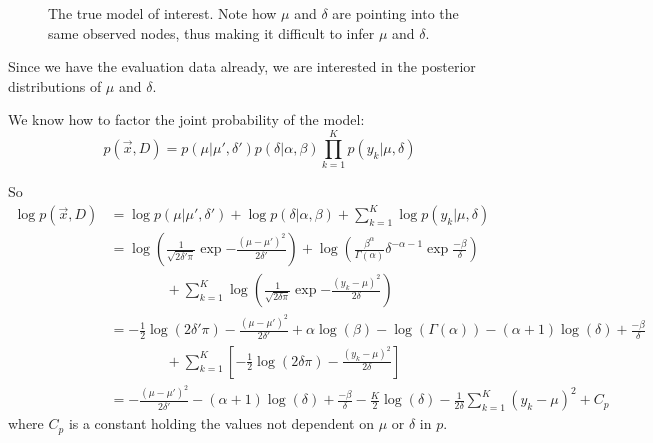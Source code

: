 \documentclass[12pt]{article}
\begin{document}
\begin{figure}[h]
    \centering
{}
    \caption{The true model of interest.  Note how $\mu$ and $\delta$ are
    pointing into the same observed nodes, thus making it difficult to infer
    $\mu$ and $\delta$.}
    \label{fig:pmodel}
\end{figure}

Since we have the evaluation data already, we are interested in the posterior
distributions of $\mu$ and $\delta$.

We know how to factor the joint probability of the model:
\begin{equation}
    p(\vec{x}, D) = p(\mu|\mu', \delta')p(\delta|\alpha, \beta)\prod_{k=1}^{K}p(y_{k}|\mu, \delta)
\end{equation}

So
\begin{align}
    \log{p(\vec{x}, D)} &= \log{p(\mu|\mu', \delta')} + \log{p(\delta|\alpha,
    \beta)} + \sum_{k=1}^{K}
    \log{p(y_{k}|\mu, \delta)} \nonumber \\
    &=
    \log{\left(\frac{1}{\sqrt{2\delta'\pi}}\exp{-\frac{(\mu-\mu')^{2}}{2\delta'}}\right)} +
    \log{\left(\frac{\beta^{\alpha}}{\Gamma(\alpha)}\delta^{-\alpha-1}\exp{\frac{-\beta}{\delta}}\right)}
    \nonumber \\
    &\quad\quad\quad\quad+ \sum_{k=1}^{K}
    \log{\left(\frac{1}{\sqrt{2\delta\pi}}\exp{-\frac{(y_{k}-\mu)^{2}}{2\delta}}\right)}
    \nonumber \\
    &= -\frac{1}{2} \log{(2\delta'\pi)} - \frac{(\mu - \mu')^{2}}{2\delta'} +
    \alpha \log{(\beta)} - \log{(\Gamma(\alpha))} - (\alpha + 1) \log{(\delta)}
    + \frac{-\beta}{\delta}\nonumber \\
    &\quad\quad\quad\quad+ \sum_{k=1}^{K} \left[-\frac{1}{2}
    \log{(2\delta\pi)} - \frac{(y_{k} - \mu)^{2}}{2\delta}\right] \nonumber \\
    &= -\frac{(\mu-\mu')^{2}}{2\delta'} - (\alpha+1)\log{(\delta)} +
    \frac{-\beta}{\delta} - \frac{K}{2}\log{(\delta)} -
    \frac{1}{2\delta}\sum_{k=1}^{K} (y_{k}-\mu)^{2} + C_p
    \label{eq:logp}
\end{align}
where $C_p$ is a constant holding the values not dependent on $\mu$ or $\delta$
in $p$.
\end{document}
